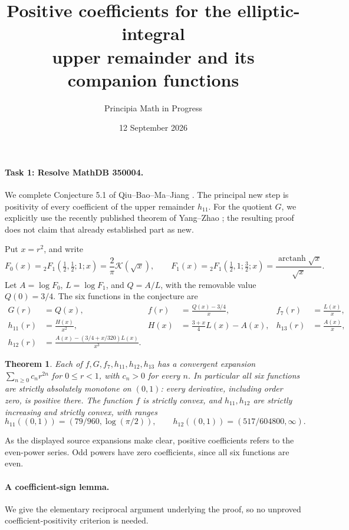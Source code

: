 \documentclass[11pt]{article}
\title{Positive coefficients for the elliptic-integral\\upper remainder and its companion functions}
\author{Principia Math in Progress}
\date{12 September 2026}
\newtheorem{theorem}{Theorem}
\begin{document}
\maketitle

\paragraph{Task 1: Resolve MathDB 350004.}
We complete Conjecture 5.1 of Qiu--Bao--Ma--Jiang \cite{QBMJ}.
The principal new step is positivity of every coefficient of the
upper remainder \(h_{11}\). For the quotient \(G\), we explicitly use
the recently published theorem of Yang--Zhao \cite{YZ}; the resulting
proof does not claim that already established part as new.

Put \(x=r^2\), and write
\[
 F_0(x)={}_2F_1(\tfrac12,\tfrac12;1;x)
       =\frac2\pi\mathcal K(\sqrt x),\qquad
 F_1(x)={}_2F_1(\tfrac12,1;\tfrac32;x)
       =\frac{\operatorname{arctanh}\sqrt x}{\sqrt x}.
\]
Let \(A=\log F_0\), \(L=\log F_1\), and \(Q=A/L\), with the
removable value \(Q(0)=3/4\). The six functions in the conjecture are
\begin{align*}
 G(r)&=Q(x),&
 f(r)&=\frac{Q(x)-3/4}{x},&
 f_7(r)&=\frac{L(x)}x,\\
 h_{11}(r)&=\frac{H(x)}{x^2},&
 H(x)&=\frac{3+x}{4}L(x)-A(x),&
 h_{13}(r)&=\frac{A(x)}x,\\
 h_{12}(r)&=\frac{A(x)-(3/4+x/320)L(x)}{x^3}.
\end{align*}

\begin{theorem}\label{thm:main}
Each of \(f,G,f_7,h_{11},h_{12},h_{13}\) has a convergent expansion
\(\sum_{n\geq0}c_nr^{2n}\) for \(0\leq r<1\), with \(c_n>0\)
for every \(n\). In particular all six functions are strictly
absolutely monotone on \((0,1)\): every derivative, including order
zero, is positive there. The function \(f\) is strictly convex, and
\(h_{11},h_{12}\) are strictly increasing and strictly convex, with ranges
\[
 h_{11}((0,1))=(79/960,\log(\pi/2)),\qquad
 h_{12}((0,1))=(517/604800,\infty).
\]
\end{theorem}

As the displayed source expansions make clear, positive
coefficients refers to the even-power series. Odd powers have
zero coefficients, since all six functions are even.

\paragraph{A coefficient-sign lemma.}
We give the elementary reciprocal argument underlying the proof,
so no unproved coefficient-positivity criterion is needed.
\end{document}
